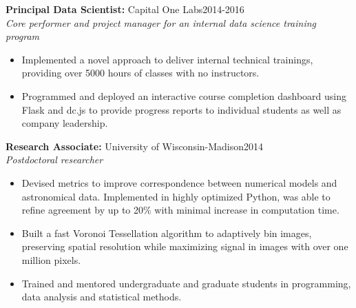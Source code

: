 \documentclass[11pt]{res}
\begin{document}
\begin{resume}
{\bf Principal Data Scientist:} Capital One Labs\hfill\mbox{2014-2016}\\
{\it Core performer and project manager for an internal data science training program}
\vspace*{0.01 in}\begin{itemize} \itemsep -2pt 
  \item Implemented a novel approach to deliver internal technical
    trainings, providing over 5000 hours of classes with no instructors.
  \item Programmed and deployed an interactive course completion dashboard using Flask
    and dc.js to provide progress reports to individual students as
    well as company leadership.
  \end{itemize}

\pagebreak
{\bf Research Associate:} University of Wisconsin-Madison\hfill\mbox{2014}\\
{\it Postdoctoral researcher}
                  \vspace* {0.01 in}\begin{itemize} \itemsep -2pt
                    \item Devised metrics to improve correspondence between numerical models and
                      astronomical data. Implemented in highly
                      optimized Python, was able to refine agreement by
                      up to 20\% with minimal increase in computation time.
                    \item Built a fast Voronoi Tessellation algorithm
                      to adaptively bin images, preserving spatial
                      resolution while maximizing signal in images
                      with over one million pixels.
                    \item Trained and mentored undergraduate and
                      graduate students in programming, data analysis and statistical methods.
                    \end{itemize}


\end{resume}
\end{document}
